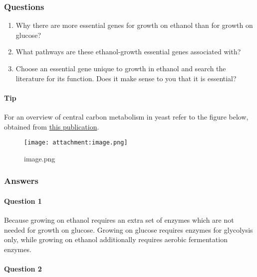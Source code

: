 \documentclass[11pt]{article}
\providecommand{\tightlist}{%
      \setlength{\itemsep}{0pt}\setlength{\parskip}{0pt}}
\begin{document}
    \hypertarget{questions}{%
\subsubsection{Questions}\label{questions}}

    \begin{enumerate}
\def\labelenumi{\arabic{enumi}.}
\tightlist
\item
  Why there are more essential genes for growth on ethanol than for
  growth on glucose?
\item
  What pathways are these ethanol-growth essential genes associated
  with?
\item
  Choose an essential gene unique to growth in ethanol and search the
  literature for its function. Does it make sense to you that it is
  essential?
\end{enumerate}

\hypertarget{tip}{%
\paragraph{Tip}\label{tip}}

For an overview of central carbon metabolism in yeast refer to the
figure below, obtained from
\href{https://journals.asm.org/doi/10.1128/mbio.02970-21}{this
publication}.

\begin{figure}
\centering
\texttt{[image: attachment:image.png]}
\caption{image.png}
\end{figure}

\hypertarget{answers}{%
\subsubsection{Answers}\label{answers}}

\hypertarget{question-1}{%
\paragraph{Question 1}\label{question-1}}

Because growing on ethanol requires an extra set of enzymes which are
not needed for growth on glucose. Growing on glucose requires enzymes
for glycolysis only, while growing on ethanol additionally requires
aerobic fermentation enzymes.

\hypertarget{question-2}{%
\paragraph{Question 2}\label{question-2}}
\end{document}
